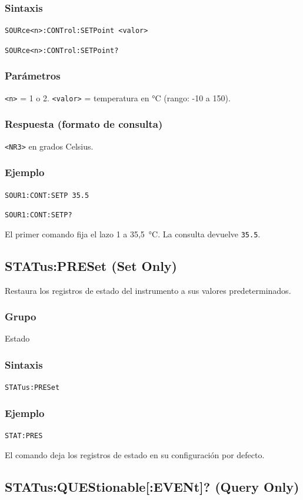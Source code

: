 \subsubsection*{Sintaxis}
\texttt{SOURce<n>:CONTrol:SETPoint <valor>}\par
\texttt{SOURce<n>:CONTrol:SETPoint?}

\subsubsection*{Parámetros}
\texttt{<n>} = 1 o 2. \texttt{<valor>} = temperatura en °C (rango: -10 a
150).

\subsubsection*{Respuesta (formato de consulta)}
\texttt{<NR3>} en grados Celsius.

\subsubsection*{Ejemplo}
\texttt{SOUR1:CONT:SETP 35.5}\par
\texttt{SOUR1:CONT:SETP?}

El primer comando fija el lazo 1 a 35,5~°C. La consulta devuelve
\texttt{35.5}.

\subsection*{STATus:PRESet (Set Only)}

Restaura los registros de estado del instrumento a sus valores
predeterminados.

\subsubsection*{Grupo}
Estado

\subsubsection*{Sintaxis}
\texttt{STATus:PRESet}

\subsubsection*{Ejemplo}
\texttt{STAT:PRES}

El comando deja los registros de estado en su configuración por defecto.

\subsection*{STATus:QUEStionable[:EVENt]? (Query Only)}

